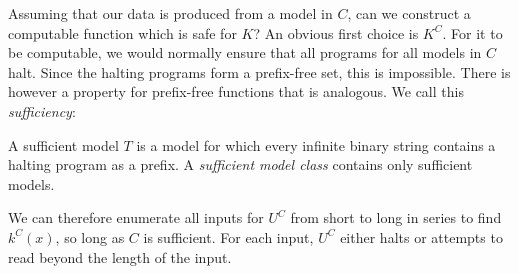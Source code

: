 Assuming that our data is produced from a model in $C$, can we construct a computable function which is safe for $K$? An obvious first choice is $K^C$. For it to be computable, we would normally ensure that all programs for all models in $C$ halt. Since the halting programs form a prefix-free set, this is impossible. There is however a property for prefix-free functions that is analogous. We call this \emph{sufficiency}:

\begin{definition}
A sufficient model $T$ is a model for which every infinite binary string contains a halting program as a prefix. A \emph{sufficient model class} contains only sufficient models. 
\end{definition}
We can therefore enumerate all inputs for $U^C$ from short to long in series to find $k^C(x)$, so long as $C$ is sufficient. For each input, $U^C$ either halts or attempts to read beyond the length of the input. 

